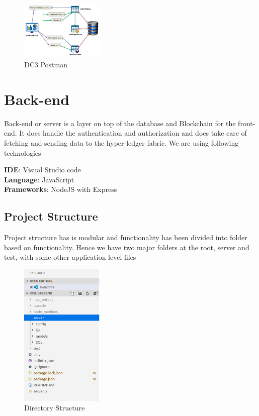 \begin{figure}[htp]
    \centering
    \includegraphics[width=4cm]{images/snet/DC3 Postman.png}
    \caption{DC3 Postman}
    \label{fig:}
\end{figure}





\section{Back-end}
Back-end or server is a layer on top of the database and Blockchain for the front-end. It does handle the authentication and authorization and does take care of fetching and sending data to the hyper-ledger fabric. We are using following technologies 

\textbf{IDE}: Visual Studio code\\
\textbf{Language}: JavaScript\\
\textbf{Frameworks}: NodeJS with Express



\subsection{Project Structure}
Project structure has is modular and functionality has been divided into folder based on functionality. Hence we have two major folders at the root, server and test, with some other application level files 


\begin{figure}[htp]
    \centering
    \includegraphics[width=4cm]{images/directystructure.png}
    \caption{Directory Structure}
    \label{fig:}
\end{figure}

